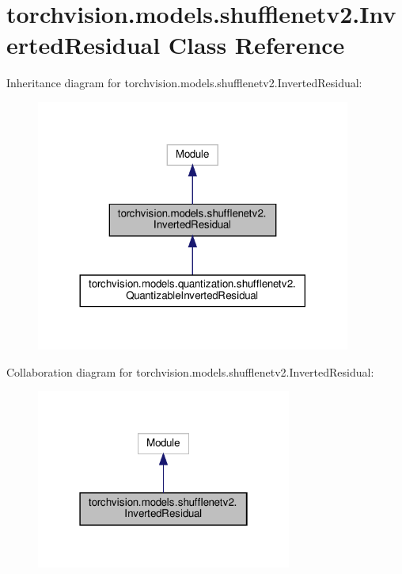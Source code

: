 \hypertarget{classtorchvision_1_1models_1_1shufflenetv2_1_1InvertedResidual}{}\section{torchvision.\+models.\+shufflenetv2.\+Inverted\+Residual Class Reference}
\label{classtorchvision_1_1models_1_1shufflenetv2_1_1InvertedResidual}


Inheritance diagram for torchvision.\+models.\+shufflenetv2.\+Inverted\+Residual\+:
\nopagebreak
\begin{figure}[H]
\begin{center}
\leavevmode
\includegraphics[width=293pt]{classtorchvision_1_1models_1_1shufflenetv2_1_1InvertedResidual__inherit__graph}
\end{center}
\end{figure}


Collaboration diagram for torchvision.\+models.\+shufflenetv2.\+Inverted\+Residual\+:
\nopagebreak
\begin{figure}[H]
\begin{center}
\leavevmode
\includegraphics[width=238pt]{classtorchvision_1_1models_1_1shufflenetv2_1_1InvertedResidual__coll__graph}
\end{center}
\end{figure}
